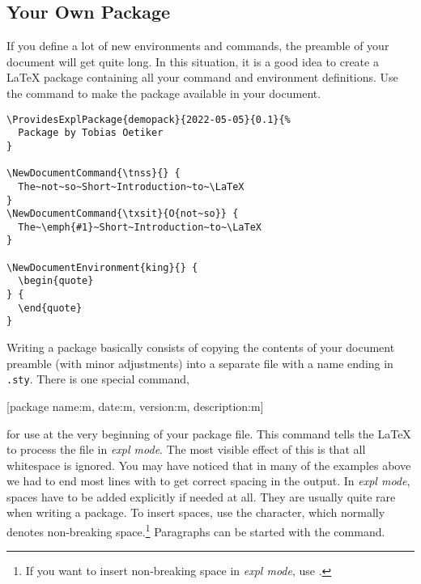 \subsection{Your Own Package}

If you define a lot of new environments and commands, the preamble of
your document will get quite long. In this situation, it is a good
idea to create a \LaTeX{} package containing all your command and
environment definitions. Use the 
command to make the package available in your document.

\begin{listing}
  \begin{lined}{\textwidth}
    \begin{verbatim}
\ProvidesExplPackage{demopack}{2022-05-05}{0.1}{%
  Package by Tobias Oetiker
}

\NewDocumentCommand{\tnss}{} {
  The~not~so~Short~Introduction~to~\LaTeX
}
\NewDocumentCommand{\txsit}{O{not~so}} {
  The~\emph{#1}~Short~Introduction~to~\LaTeX
}

\NewDocumentEnvironment{king}{} {
  \begin{quote}
} {
  \end{quote}
}
\end{verbatim}
  \end{lined}
  \caption{Example Package.}\label{package}
\end{listing}

Writing a package basically consists of copying the contents of your document
preamble (with minor adjustments) into a separate file with a name ending in
\texttt{.sty}. There is one special command,
\begin{lscommand}
  [package name:m, date:m, version:m, description:m]
\end{lscommand}
\noindent for use at the very beginning of your package file. This command
tells the \LaTeX{} to process the  file in \emph{expl mode}. The most visible effect of this is
that all whitespace is ignored. You may have noticed that in many of the
examples above we had to end most lines with \ai{\%} to get correct
spacing in the output. In \emph{expl mode}, spaces have to be added explicitly if needed at all. They are usually
quite rare when writing a package. To insert spaces, use
the \ai{\~} character, which normally denotes non-breaking space.\footnote{If
  you want to insert non-breaking space in \emph{expl mode}, use
  .} Paragraphs can be started with the  command.

